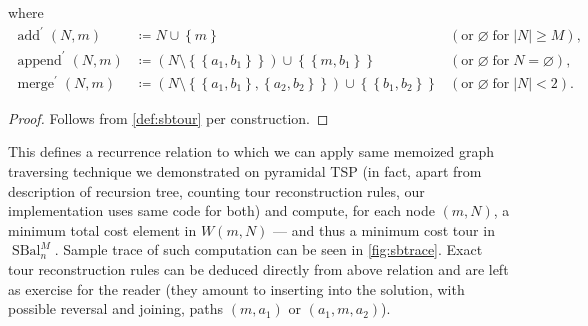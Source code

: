 \documentclass[index=totoc,bibliography=totoc]{scrartcl}
\newcommand{\annotation}[1]{\marginpar{\small\itshape\color{green}#1}}
\numberwithin{equation}{section}
\numberwithin{figure}{section}
\numberwithin{table}{section}
\begin{document}
\begin{proposition}
  where
  \[
  \begin{alignedat}{2}
    \operatorname{add}^\prime\left(N,m\right) & \coloneqq
    N \cup \left\{m\right\}
    & (\text{or}\; \varnothing \;\text{for}\; \left|N\right| \geq M),
    \\
    \operatorname{append}^\prime\left(N,m\right) & \coloneqq
    \left(N \setminus \left\{\left\{a_1,b_1\right\}\right\}\right) \cup \left\{\left\{m,b_1\right\}\right\}
    & (\text{or}\; \varnothing \;\text{for}\; N = \varnothing),
    \\
    \operatorname{merge}^\prime\left(N,m\right) & \coloneqq
    \left(N \setminus \left\{\left\{a_1,b_1\right\},\left\{a_2,b_2\right\}\right\}\right)
      \cup \left\{\left\{b_1,b_2\right\}\right\}
    & (\text{or}\; \varnothing \;\text{for}\; \left|N\right| < 2).
  \end{alignedat}
  \]
\end{proposition}
\begin{proof}
  Follows from \cref{def:sbtour} per construction.
\end{proof}

This defines a recurrence relation to which we can apply same memoized
graph traversing technique we demonstrated on pyramidal TSP (in fact, apart
from description of recursion tree, counting tour reconstruction rules, our
implementation uses same code for both) and compute, for each node
$\left(m,N\right)$, a minimum total cost element in $W\left(m,N\right)$ ---
and thus a minimum cost tour in $\operatorname{SBal}_n^M$.  Sample trace of
such computation can be seen in \cref{fig:sbtrace}.  Exact tour
reconstruction rules can be deduced directly from above relation and are
left as exercise for the reader (they amount to inserting into the
solution, with possible reversal and joining, paths $(m,a_1)$ or
$(a_1,m,a_2)$).

\setlength{\aboverulesep}{0pt}
\setlength{\belowrulesep}{0pt}
\renewcommand{\tabcolsep}{9pt}
\setlength{\extrarowheight}{1.1ex}
\end{document}
